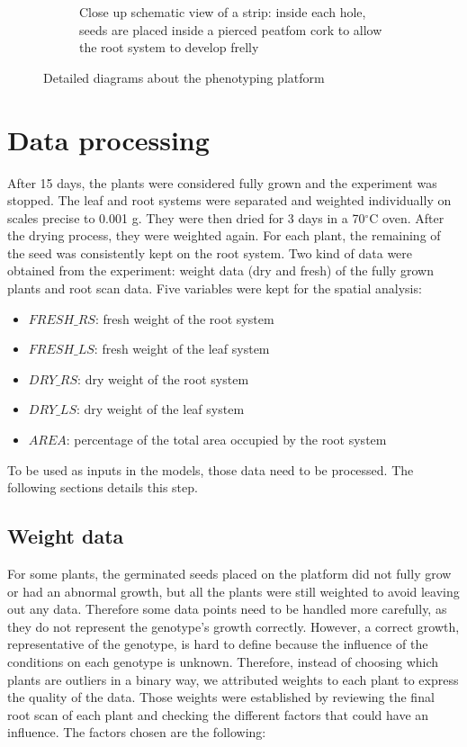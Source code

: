 \begin{figure}[!htb]
\begin{subfigure}[b]{0.475\textwidth}
            \caption{Close up schematic view of a strip: inside each hole, seeds are placed inside a pierced peatfom cork to allow the root system to develop frelly}    
            \label{fig:seed_platform_close_up}
        \end{subfigure}
        \caption{Detailed diagrams about the phenotyping platform}
    \end{figure}


\section{Data processing}
After 15 days, the plants were considered fully grown and the experiment was stopped. The leaf and root systems were separated and weighted individually on scales precise to 0.001 g. They were then dried for 3 days in a 70$^{\circ}$C oven. After the drying process, they were weighted again. For each plant, the remaining of the seed was consistently kept on the root system.
Two kind of data were obtained from the experiment: weight data (dry and fresh) of the fully grown plants and root scan data. Five variables were kept for the spatial analysis:

\begin{itemize}
\item $FRESH\_RS$: fresh weight of the root system
\item $FRESH\_LS$: fresh weight of the leaf system
\item $DRY\_RS$: dry weight of the root system
\item $DRY\_LS$: dry weight of the leaf system
\item $AREA$: percentage of the total area occupied by the root system
\end{itemize} 

To be used as inputs in the models, those data need to be processed. The following sections details this step.

\subsection{Weight data}
For some plants, the germinated seeds placed on the platform did not fully grow or had an abnormal growth, but all the plants were still weighted to avoid leaving out any data. Therefore some data points need to be handled more carefully, as they do not represent the genotype's growth correctly. However, a correct growth, representative of the genotype, is hard to define because the influence of the conditions on each genotype is unknown. Therefore, instead of choosing which plants are outliers in a binary way, we attributed weights to each plant to express the quality of the data. Those weights were established by reviewing the final root scan of each plant and checking the different factors that could have an influence. The factors chosen are the following:

